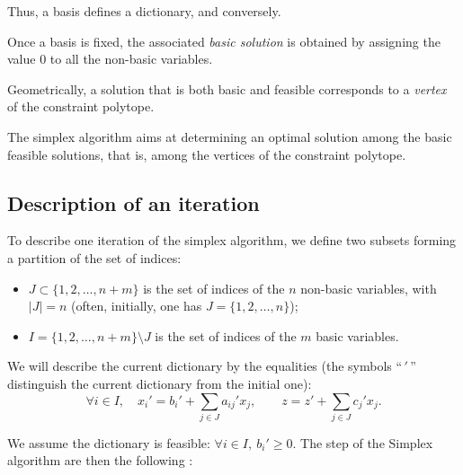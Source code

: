 \begin{remark}
    Thus, a basis defines a dictionary, and conversely.
\end{remark}

\begin{definition}
    Once a basis is fixed, the associated \emph{basic solution} is obtained by assigning the value $0$ to all the non-basic variables.
\end{definition}

\begin{remark}
    Geometrically, a solution that is both basic and feasible corresponds to a \emph{vertex} of the constraint polytope. 
    
    The simplex algorithm aims at determining an optimal solution among the basic feasible solutions, that is, among the vertices of the constraint polytope.
\end{remark}

\subsection{Description of an iteration}

To describe one iteration of the simplex algorithm, we define two subsets forming a partition of the set of indices:

\begin{itemize}
  \item $J \subset \{1,2,\dots,n+m\}$ is the set of indices of the $n$ non-basic variables, with $|J|=n$ (often, initially, one has $J=\{1,2,\dots,n\}$);
  \item $I = \{1,2,\dots,n+m\} \setminus J$ is the set of indices of the $m$ basic variables.
\end{itemize}

We will describe the current dictionary by the equalities (the symbols “$\,'\,$” distinguish the current dictionary from the initial one):
\[
   \forall i \in I, \quad x_i' = b_i' + \sum_{j \in J} a_{ij}' x_j,
   \qquad 
   z = z' + \sum_{j \in J} c_j' x_j .
\]

We assume the dictionary is feasible: $\forall i \in I, \ b_i' \geq 0$. The step of the Simplex algorithm are then the following :

